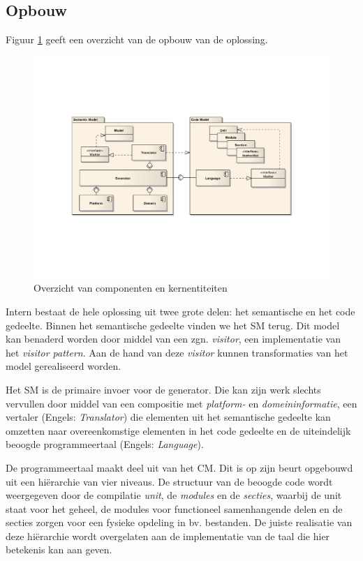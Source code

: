 
\subsection{Opbouw}

Figuur \ref{fig:devel-component-overview} geeft een overzicht van de opbouw van
de oplossing.

\begin{figure}[ht]
  \centering
  \includegraphics[width=\linewidth]{resources/component-overview.pdf}
  \caption{Overzicht van componenten en kernentiteiten}
  \label{fig:devel-component-overview}
\end{figure}

Intern bestaat de hele oplossing uit twee grote delen: het semantische en het
code gedeelte. Binnen het semantische gedeelte vinden we het SM terug. Dit
model kan benaderd worden door middel van een zgn. \emph{visitor}, een
implementatie van het \emph{visitor pattern}. Aan de hand van deze
\emph{visitor} kunnen transformaties van het model gerealiseerd worden.

Het SM is de primaire invoer voor de generator. Die kan zijn werk slechts
vervullen door middel van een compositie met \emph{platform-} en
\emph{domeininformatie}, een vertaler (Engels: \emph{Translator}) die elementen
uit het semantische gedeelte kan omzetten naar overeenkomstige elementen in het
code gedeelte en de uiteindelijk beoogde programmeertaal (Engels:
\emph{Language}).

De programmeertaal maakt deel uit van het CM. Dit is op zijn beurt opgebouwd
uit een hi\"erarchie van vier niveaus. De structuur van de beoogde code wordt
weergegeven door de compilatie \emph{unit}, de \emph{modules} en de
\emph{secties}, waarbij de unit staat voor het geheel, de modules voor
functioneel samenhangende delen en de secties zorgen voor een fysieke opdeling
in bv. bestanden. De juiste realisatie van deze hi\"erarchie wordt overgelaten
aan de implementatie van de taal die hier betekenis kan aan geven.

